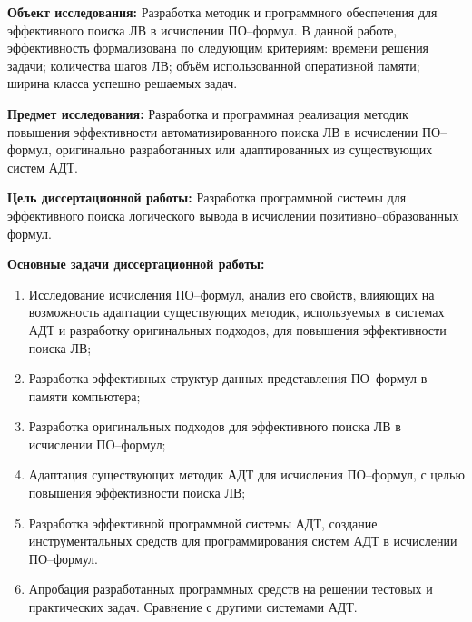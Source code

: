 \documentclass[a4paper]{report}
\begin{document}
\textbf{Объект исследования:}
Разработка методик и программного обеспечения для эффективного поиска ЛВ в исчислении ПО--формул. В данной работе, эффективность формализована по следующим критериям: времени решения задачи; количества шагов ЛВ; объём использованной оперативной памяти; ширина класса успешно решаемых задач.

\textbf{Предмет исследования:}
Разработка и программная реализация методик повышения эффективности автоматизированного поиска ЛВ в исчислении ПО--формул, оригинально разработанных или адаптированных из существующих систем АДТ.

\textbf{Цель диссертационной работы:}
Разработка программной системы для эффективного поиска логического вывода в исчислении позитивно--образованных формул.

\textbf{Основные задачи диссертационной работы:}
\begin{enumerate}
\item Исследование исчисления ПО--формул, анализ его свойств, влияющих на возможность адаптации существующих методик, используемых в системах АДТ и разработку оригинальных подходов, для повышения эффективности поиска ЛВ;
\item Разработка эффективных структур данных представления ПО--формул в памяти компьютера;
\item Разработка оригинальных подходов для эффективного поиска ЛВ в исчислении ПО--формул; 
\item Адаптация существующих методик АДТ для исчисления ПО--формул, с целью повышения эффективности поиска ЛВ;
\item Разработка эффективной программной системы АДТ, создание инструментальных средств для программирования систем АДТ в исчислении ПО--формул.
\item Апробация разработанных программных средств на решении тестовых и практических задач. Сравнение с другими системами АДТ.
\end{enumerate}


\end{document}
